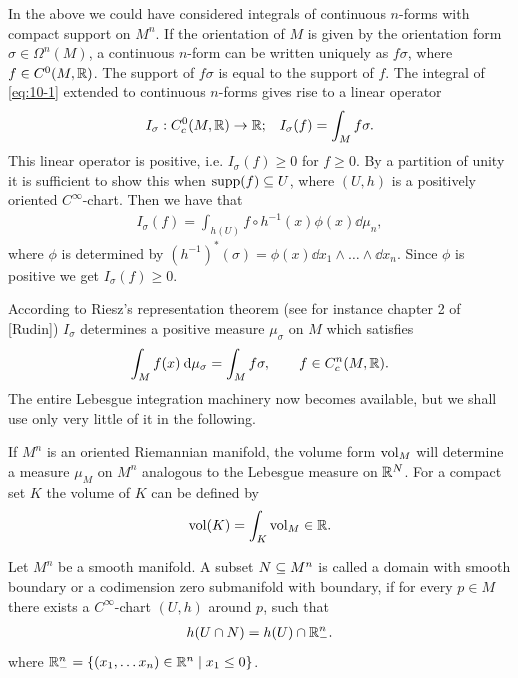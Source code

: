\begin{remark}\label{remark:10-4}
  In the above we could have considered integrals of continuous
  $n$-forms with compact support on $M^n$. If the orientation of $M$ is given by the
  orientation form $\sigma\in\Omega^n(M)$, a continuous $n$-form can be written uniquely as
  $f\sigma$, where $f\in C^0(M, {\mathbb{R}})$. The support of $f\sigma$ is equal to the support of $f$. The
  integral of \eqref{eq:10-1} extended to continuous $n$-forms gives rise to a linear operator
  \begin{align*}
    I_\sigma: C^0_c(M, {\mathbb{R}})\to {\ensuremath{\mathbb{R}}}; && 
    I_\sigma(f) = \int_M f\sigma.
  \end{align*}
  This linear operator is positive, i.e. $I_\sigma(f)\ge 0$ for $f\ge 0$. By a partition of unity 
  it is sufficient to show this when $\operatorname{supp}(f)\subseteq U$, where $(U, h)$ is a positively oriented $C^\infty$-chart.
  Then we have that 
  \begin{align*}
    I_\sigma(f) = \int_{h(U)} f\circ h^{-1}(x)\phi(x)\dd \mu_n,
  \end{align*}
  where $\phi$ is determined by $(h^{-1})^*(\sigma) = \phi(x)\dd x_1\wedge\ldots\wedge\dd x_n$. Since 
  $\phi$ is positive we get $I_\sigma(f)\ge 0$.

  According to Riesz's representation theorem (see for instance chapter 2 of [Rudin])
  $I_\sigma$ determines a positive measure $\mu_\sigma$ on $M$ which satisfies
  \begin{align*}
    \int_M f(x)\dd\mu_\sigma = \int_M f\sigma, \qquad f\in C^n_c(M, \RR).
  \end{align*}
  The entire Lebesgue integration machinery now becomes available, but we shall
  use only very little of it in the following.

  If $M^n$ is an oriented Riemannian manifold, the volume form $\mathrm{vol}_M$ will determine
  a measure $\mu_M$ on $M^n$ analogous to the Lebesgue measure on ${\mathbb{R}}^N$. For a compact
  set $K$ the volume of $K$ can be defined by
  \begin{align*}
    \mathrm{vol}(K) = \int_K \mathrm{vol}_M \in {\ensuremath{\mathbb{R}}}.
  \end{align*}
\end{remark}

\begin{definition}\label{definition:10-5}
  Let $M^n$ be a smooth manifold. A subset $N\subseteq M^n$ is called a
domain with smooth boundary or a codimension zero submanifold with boundary,
if for every $p\in M$ there exists a $C^\infty$-chart $(U, h)$ around $p$, such that
\begin{align}\label{eq:10-2}
  h(U\cap N) = h(U)\cap {\ensuremath{\mathbb{R}}}^n_-.
\end{align}
where ${\mathbb{R}}^n_- = \{(x_1, \ldots x_n)\in{\ensuremath{\mathbb{R}}}^n\mid x_1\le 0\}$. 
\end{definition}


